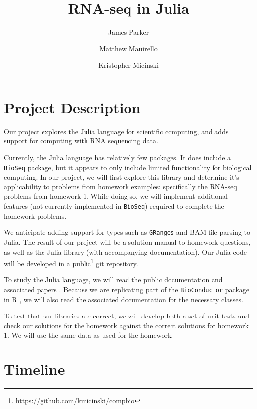 \documentclass[10pt]{article}
\title{RNA-seq in Julia}
\author{James Parker}
\author{Matthew Mauirello}
\author{Kristopher Micinski}
\begin{document}
\maketitle

\section{Project Description}

Our project explores the Julia language for scientific computing, and
adds support for computing with RNA sequencing data.

Currently, the Julia language has relatively few packages.  It does
include a \texttt{BioSeq} \cite{bioseq} package, but it appears to
only include limited functionality for biological computing.  In our
project, we will first explore this library and determine it's
applicability to problems from homework examples: specifically the
RNA-seq problems from homework 1.  While doing so, we will implement
additional features (not currently implemented in \texttt{BioSeq})
required to complete the homework problems.

We anticipate adding support for types such as \texttt{GRanges} and
BAM file parsing to Julia.  The result of our project will be a
solution manual to homework questions, as well as the Julia library
(with accompanying documentation).  Our Julia code will be developed
in a public\footnote{\url{https://github.com/kmicinski/compbio}} git
repository.

To study the Julia language, we will read the public documentation and
associated papers \cite{juliapaper}.  Because we are replicating part
of the \texttt{BioConductor} package in R \cite{bioconductor}, we will
also read the associated documentation for the necessary classes.

To test that our libraries are correct, we will develop both a set of
unit tests and check our solutions for the homework against the
correct solutions for homework 1.  We will use the same data as used
for the homework.

\section{Timeline}
\end{document}
